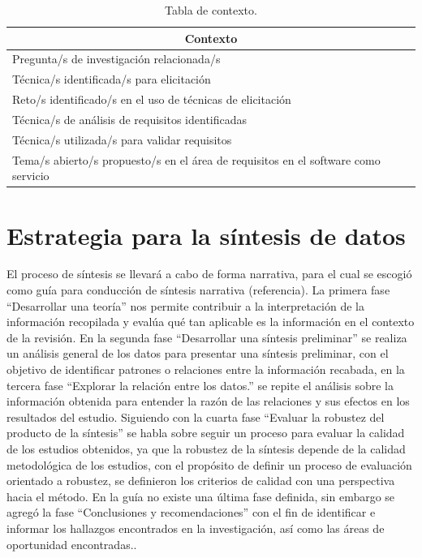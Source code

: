 \documentclass{article}
\begin{document}
\begin{table}[h!]
    \begin{center}
    \caption{Tabla de contexto.}
    \label{tab:datosgenerales}
    \begin{tabular}{|l|c|}
    \hline
    \multicolumn{2}{|c|}{Contexto} \\
    \hline
    Pregunta/s de investigación relacionada/s & \\
    \hline
    Técnica/s identificada/s para elicitación& \\
    \hline
    Reto/s identificado/s en el uso de técnicas de elicitación& \\
    \hline
    Técnica/s de análisis de requisitos identificadas& \\
    \hline
    Técnica/s utilizada/s para validar requisitos & \\
    \hline
    Tema/s abierto/s propuesto/s en el área de requisitos en el software como servicio& \\
    \hline
    \end{tabular}
    \end{center}
\end{table}


\section{Estrategia para la síntesis de datos}
El proceso de síntesis se llevará a cabo de forma narrativa, para el cual se escogió como guía para conducción de síntesis narrativa (referencia). 
La primera fase “Desarrollar una teoría” nos permite contribuir a la interpretación de la información recopilada y evalúa qué tan aplicable es la 
información en el contexto de la revisión. En la segunda fase “Desarrollar una síntesis preliminar” se realiza un análisis general de los datos 
para presentar una síntesis preliminar, con el objetivo de identificar patrones o relaciones entre la información recabada, en la tercera fase 
“Explorar la relación entre los datos.” se repite el análisis sobre la información obtenida para entender la razón de las relaciones y sus efectos 
en los resultados del estudio. Siguiendo con la cuarta fase “Evaluar la robustez del producto de la síntesis” se habla sobre seguir un proceso 
para evaluar la calidad de los estudios obtenidos, ya que la robustez de la síntesis depende de la calidad metodológica de los estudios, con el 
propósito de definir un proceso de evaluación orientado a robustez, se definieron los criterios de calidad con una perspectiva hacia el método. 
En la guía no existe una última fase definida, sin embargo se agregó la fase “Conclusiones y recomendaciones” 
con el fin de identificar e informar los hallazgos encontrados en la investigación, así como las áreas de oportunidad encontradas..  
\end{document}
